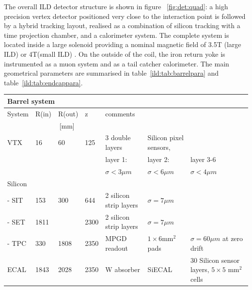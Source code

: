 The overall ILD detector structure is shown in figure ~\ref{fig:det:quad}: a high precision vertex detector positioned very close to the interaction point is followed by a hybrid tracking layout, realised as a combination of silicon tracking with a time projection chamber, and a calorimeter system. The complete system is located inside a large solenoid providing a nominal magnetic field of 3.5T (large ILD) or 4T(small ILD) . On the outside of the coil, the iron return yoke is instrumented as a muon system and as a tail catcher calorimeter. 
The main geometrical parameters are summarised in table~\ref{ild:tab:barrelpara} and table~\ref{ild:tab:endcappara}.
\begin{table}\hspace*{-0cm}\small
\begin{tabular}{ l p{0.05\hsize}p{0.04\hsize}p{0.04\hsize} p{0.20\hsize}p{0.20\hsize}p{0.20\hsize} }
\toprule
\multicolumn{7}{l}{{\bf Barrel system}}\\
\midrule
System & R(in) & R(out) & z & \multicolumn{3}{l}{comments}\\
       & \multicolumn{3}{c}{[mm]}   &&&\\
\midrule
VTX    & 16         & 60        & 125 & 3 double layers &  Silicon pixel sensors, & \\
       &            &           &           & layer 1: & layer 2: & layer 3-6 \\
       &            &           &           & $\sigma<3 \mu m$ & $\sigma < 6 \mu m$ & $\sigma < 4 \mu m$ \\
Silicon &           &           & &&&\\
- SIT   & 153       & 300       & 644   & 2 silicon strip layers & $\sigma = 7 \mu m$& \\
- SET   & 1811      &           & 2300   & 2 silicon strip layers & $\sigma = 7 \mu m$& \\
- TPC   & 330       & 1808      & 2350   & MPGD readout & $1 \times 6 $mm$^2$ pads & $\sigma=60 \mu m$ at zero drift \\
\midrule
ECAL    & 1843      & 2028      & 2350   & W absorber  & SiECAL & 30 Silicon sensor layers, $5 \times 5$ mm$^2$ cells \\

\end{tabular}
\end{table}

